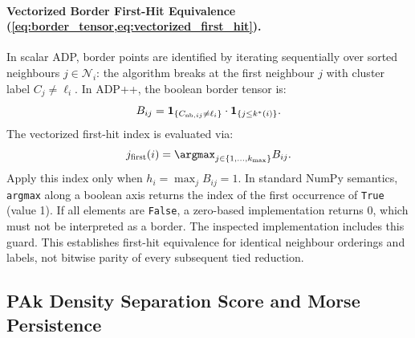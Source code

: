 \paragraph{Vectorized Border First-Hit Equivalence
(\cref{eq:border_tensor,eq:vectorized_first_hit}).}
In scalar ADP, border points are identified by iterating
sequentially over sorted neighbours
$j \in \mathcal{N}_i$: the algorithm breaks at the first neighbour
$j$ with cluster label $C_j \ne \ell_i$.
In \textsc{ADP++}, the boolean border tensor is:
\begin{equation}
  B_{ij} = \mathbf{1}_{\{C_{\mathrm{nb}, ij} \ne \ell_i\}} \cdot
  \mathbf{1}_{\{j \le k^{*}(i)\}}.
\end{equation}
The vectorized first-hit index is evaluated via:
\begin{equation}
  j_{\mathrm{first}}(i) = \argmax_{j \in \{1, \dots, k_{\max}\}} B_{ij}.
\end{equation}
Apply this index only when $h_i=\max_jB_{ij}=1$.
In standard NumPy semantics, \texttt{argmax} along a boolean axis
returns the index
of the first occurrence of \texttt{True} (value 1). If all elements are
\texttt{False}, a zero-based implementation returns 0, which must not
be interpreted as a border. The inspected implementation includes this
guard. This establishes first-hit equivalence for identical neighbour
orderings and labels, not bitwise parity of every subsequent tied reduction.

\subsection{PAk Density Separation Score and Morse Persistence}
\label{subsec:supp_ds_score}

